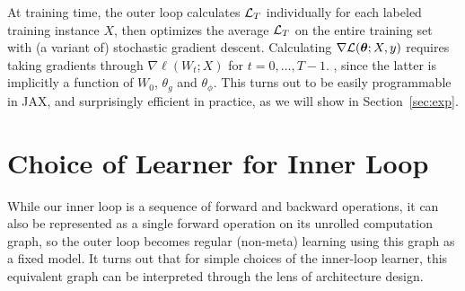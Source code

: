 \documentclass{article} %
\begin{document}
At training time, the outer loop calculates $\mathcal{L}_T$ individually for each labeled training instance $X$, then optimizes the average $\mathcal{L}_T$ on the entire training set with (a variant of) stochastic gradient descent. 
Calculating $\nabla\mathcal{L}(\boldsymbol{\theta}; X, y)$ requires taking gradients through $\nabla \ell(W_t; X)$ for $t=0,\dots,T-1$.
, since the latter is implicitly a function of $W_0$, $\theta_g$ and $\theta_\phi$.
This turns out to be easily programmable in JAX, and surprisingly efficient in practice, as we will show in Section~\ref{sec:exp}.

\section{Choice of Learner for Inner Loop}
While our inner loop is a sequence of forward and backward operations, it can also be represented as a single forward operation on its unrolled computation graph, so the outer loop becomes regular (non-meta) learning using this graph as a fixed model.
It turns out that for simple choices of the inner-loop learner, this equivalent graph can be interpreted through the lens of architecture design.

\label{sec:learner}
\end{document}
